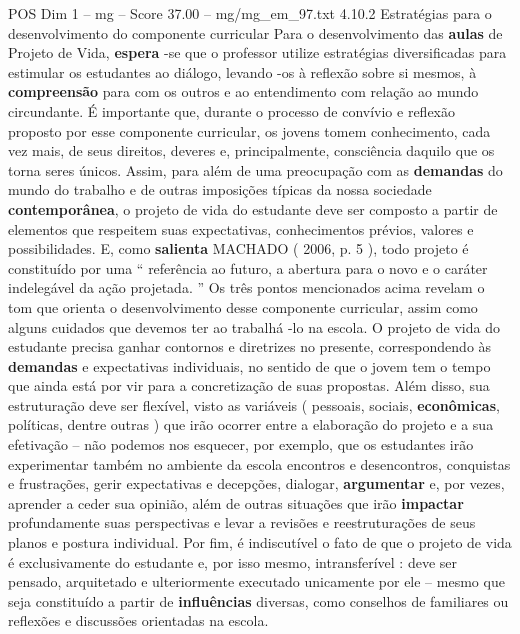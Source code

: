 \begin{textsample}{POS Dim 1 – mg – Score 37.00 – mg/mg\_em\_97.txt}  \label{ex:f1_pos_240}
4.10.2 Estratégias para o desenvolvimento do componente curricular Para o desenvolvimento das \textbf{aulas} de Projeto de Vida, \textbf{espera} -se que o professor utilize estratégias diversificadas para estimular os estudantes ao diálogo, levando -os à reflexão sobre si mesmos, à \textbf{compreensão} para com os outros e ao entendimento com relação ao mundo circundante.
É importante que, durante o processo de convívio e reflexão proposto por esse componente curricular, os jovens tomem conhecimento, cada vez mais, de seus direitos, deveres e, principalmente, consciência daquilo que os torna seres únicos.
Assim, para além de uma preocupação com as \textbf{demandas} do mundo do trabalho e de outras imposições típicas da nossa sociedade \textbf{contemporânea}, o projeto de vida do estudante deve ser composto a partir de elementos que respeitem suas expectativas, conhecimentos prévios, valores e possibilidades.
E, como \textbf{salienta} MACHADO ( 2006, p. 5 ), todo projeto é constituído por uma “ referência ao futuro, a abertura para o novo e o caráter indelegável da ação projetada. ” Os três pontos mencionados acima revelam o tom que orienta o desenvolvimento desse componente curricular, assim como alguns cuidados que devemos ter ao trabalhá -lo na escola.
O projeto de vida do estudante precisa ganhar contornos e diretrizes no presente, correspondendo às \textbf{demandas} e expectativas individuais, no sentido de que o jovem tem o tempo que ainda está por vir para a concretização de suas propostas.
Além disso, sua estruturação deve ser flexível, visto as variáveis ( pessoais, sociais, \textbf{econômicas}, políticas, dentre outras ) que irão ocorrer entre a elaboração do projeto e a sua efetivação – não podemos nos esquecer, por exemplo, que os estudantes irão experimentar também no ambiente da escola encontros e desencontros, conquistas e frustrações, gerir expectativas e decepções, dialogar, \textbf{argumentar} e, por vezes, aprender a ceder sua opinião, além de outras situações que irão \textbf{impactar} profundamente suas perspectivas e levar a revisões e reestruturações de seus planos e postura individual.
Por fim, é indiscutível o fato de que o projeto de vida é exclusivamente do estudante e, por isso mesmo, intransferível : deve ser pensado, arquitetado e ulteriormente executado unicamente por ele – mesmo que seja constituído a partir de \textbf{influências} diversas, como conselhos de familiares ou reflexões e discussões orientadas na escola.

\end{textsample}
